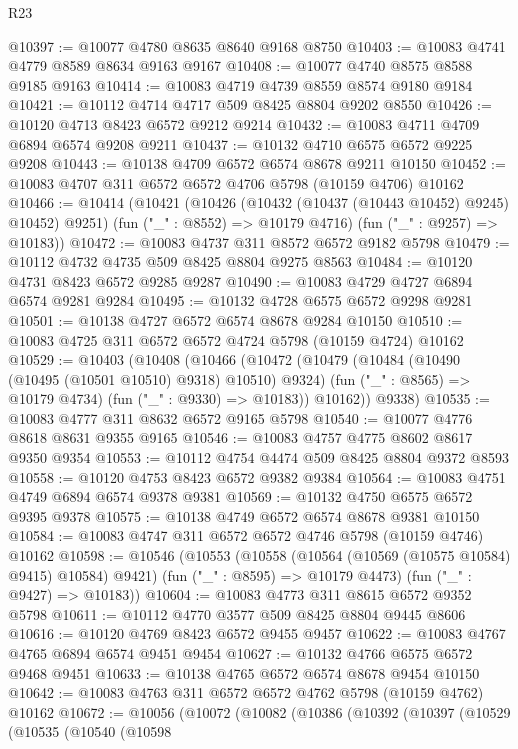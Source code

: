 \begin{lexlean}{R23}
\begin{coremodule}
@10397 := @10077 @4780 @8635 @8640 @9168 @8750
@10403 := @10083 @4741 @4779 @8589 @8634 @9163 @9167
@10408 := @10077 @4740 @8575 @8588 @9185 @9163
@10414 := @10083 @4719 @4739 @8559 @8574 @9180 @9184
@10421 := @10112 @4714 @4717 @509 @8425 @8804 @9202 @8550
@10426 := @10120 @4713 @8423 @6572 @9212 @9214
@10432 := @10083 @4711 @4709 @6894 @6574 @9208 @9211
@10437 := @10132 @4710 @6575 @6572 @9225 @9208
@10443 := @10138 @4709 @6572 @6574 @8678 @9211 @10150
@10452 := @10083 @4707 @311 @6572 @6572 @4706 @5798 (@10159 @4706) @10162
@10466 := @10414
    (@10421
      (@10426 (@10432 (@10437 (@10443 @10452) @9245) @10452) @9251)
      (fun ("_" : @8552) => @10179 @4716)
      (fun ("_" : @9257) => @10183))
@10472 := @10083 @4737 @311 @8572 @6572 @9182 @5798
@10479 := @10112 @4732 @4735 @509 @8425 @8804 @9275 @8563
@10484 := @10120 @4731 @8423 @6572 @9285 @9287
@10490 := @10083 @4729 @4727 @6894 @6574 @9281 @9284
@10495 := @10132 @4728 @6575 @6572 @9298 @9281
@10501 := @10138 @4727 @6572 @6574 @8678 @9284 @10150
@10510 := @10083 @4725 @311 @6572 @6572 @4724 @5798 (@10159 @4724) @10162
@10529 := @10403
    (@10408
      (@10466
        (@10472
          (@10479
            (@10484 (@10490 (@10495 (@10501 @10510) @9318) @10510) @9324)
            (fun ("_" : @8565) => @10179 @4734)
            (fun ("_" : @9330) => @10183))
          @10162))
      @9338)
@10535 := @10083 @4777 @311 @8632 @6572 @9165 @5798
@10540 := @10077 @4776 @8618 @8631 @9355 @9165
@10546 := @10083 @4757 @4775 @8602 @8617 @9350 @9354
@10553 := @10112 @4754 @4474 @509 @8425 @8804 @9372 @8593
@10558 := @10120 @4753 @8423 @6572 @9382 @9384
@10564 := @10083 @4751 @4749 @6894 @6574 @9378 @9381
@10569 := @10132 @4750 @6575 @6572 @9395 @9378
@10575 := @10138 @4749 @6572 @6574 @8678 @9381 @10150
@10584 := @10083 @4747 @311 @6572 @6572 @4746 @5798 (@10159 @4746) @10162
@10598 := @10546
    (@10553
      (@10558 (@10564 (@10569 (@10575 @10584) @9415) @10584) @9421)
      (fun ("_" : @8595) => @10179 @4473)
      (fun ("_" : @9427) => @10183))
@10604 := @10083 @4773 @311 @8615 @6572 @9352 @5798
@10611 := @10112 @4770 @3577 @509 @8425 @8804 @9445 @8606
@10616 := @10120 @4769 @8423 @6572 @9455 @9457
@10622 := @10083 @4767 @4765 @6894 @6574 @9451 @9454
@10627 := @10132 @4766 @6575 @6572 @9468 @9451
@10633 := @10138 @4765 @6572 @6574 @8678 @9454 @10150
@10642 := @10083 @4763 @311 @6572 @6572 @4762 @5798 (@10159 @4762) @10162
@10672 := @10056
    (@10072
      (@10082
        (@10386
          (@10392
            (@10397
              (@10529
                (@10535
                  (@10540
                    (@10598

\end{coremodule}
\end{lexlean}
